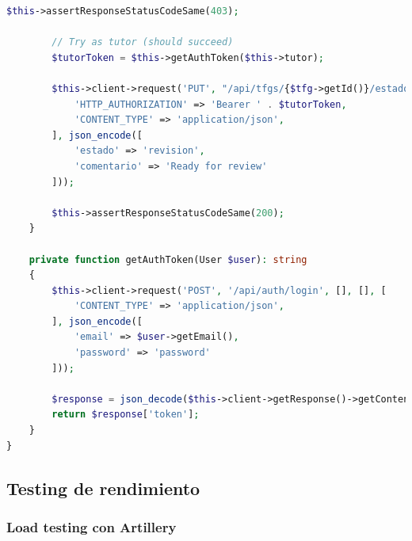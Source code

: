 \documentclass[12pt,a4paper,oneside]{report}
\begin{document}
\begin{lstlisting}[language=PHP]
        $this->assertResponseStatusCodeSame(403);

        // Try as tutor (should succeed)
        $tutorToken = $this->getAuthToken($this->tutor);
        
        $this->client->request('PUT', "/api/tfgs/{$tfg->getId()}/estado", [], [], [
            'HTTP_AUTHORIZATION' => 'Bearer ' . $tutorToken,
            'CONTENT_TYPE' => 'application/json',
        ], json_encode([
            'estado' => 'revision',
            'comentario' => 'Ready for review'
        ]));

        $this->assertResponseStatusCodeSame(200);
    }

    private function getAuthToken(User $user): string
    {
        $this->client->request('POST', '/api/auth/login', [], [], [
            'CONTENT_TYPE' => 'application/json',
        ], json_encode([
            'email' => $user->getEmail(),
            'password' => 'password'
        ]));

        $response = json_decode($this->client->getResponse()->getContent(), true);
        return $response['token'];
    }
}
\end{lstlisting}

\subsection{Testing de rendimiento}\label{testing-de-rendimiento}

\subsubsection{Load testing con
Artillery}\label{load-testing-con-artillery}
\end{document}
